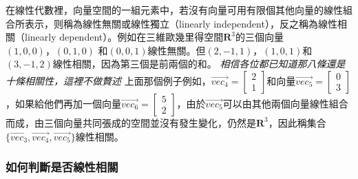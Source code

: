\documentclass[11pt]{article}
\begin{document}
{在線性代數裡，向量空間的一組元素中，若沒有向量可用有限個其他向量的線性組合所表示，则稱為線性無關或線性獨立（linearly
independent），反之稱為線性相關（linearly
dependent）。例如在三維歐幾里得空間\(\mathbf{R}^3\)的三個向量\((1, 0, 0)，(0, 1, 0)\)
和\((0, 0, 1)\)線性無關。但\((2, −1, 1)，(1, 0, 1)\)和
\((3, −1, 2)\)線性相關，因為第三個是前兩個的和。
\emph{相信各位都已知道那八條還是十條相關性，這裡不做贅述}
上面那個例子例如，\(\vec{vec_4} = \begin{bmatrix} 2 \\ 1 \end{bmatrix}\)和向量\(\vec{vec_5} = \begin{bmatrix} 0 \\ 3 \end{bmatrix}\)，如果給他們再加一個向量\(\vec{vec_6} = \begin{bmatrix} 5 \\ 2 \end{bmatrix}\)，由於\(\vec{vec_5}\)可以由其他兩個向量線性組合而成，由三個向量共同張成的空間並沒有發生變化，仍然是\(\mathbf{R}^3\)，因此稱集合\(\{\vec{vec_3}, \vec{vec_4}, \vec{vec_5}\}\)線性相關。

    \hypertarget{ux5982ux4f55ux5224ux65b7ux662fux5426ux7ddaux6027ux76f8ux95dc}{%
\subsubsection{如何判斷是否線性相關}\label{ux5982ux4f55ux5224ux65b7ux662fux5426ux7ddaux6027ux76f8ux95dc}}

}
\end{document}
